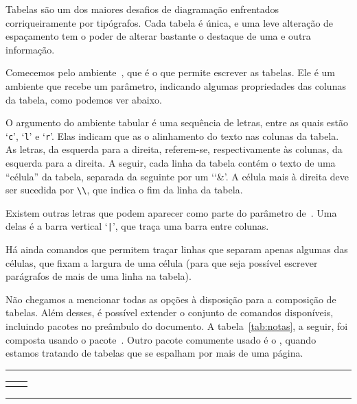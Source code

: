Tabelas são um dos maiores desafios de diagramação enfrentados
corriqueiramente por tipógrafos. Cada tabela é única, e uma leve
alteração de espaçamento tem o poder de alterar bastante o destaque de
uma e outra informação.

Comecemos pelo ambiente~, que é o que permite
escrever as tabelas. Ele é um ambiente que recebe um parâmetro,
indicando algumas propriedades das colunas da tabela, como podemos ver abaixo.

O argumento do ambiente tabular é uma sequência de letras, entre as
quais estão `{\tt c}', `{\tt l}' e `{\tt r}'. Elas indicam que as
o alinhamento do texto nas colunas da tabela. As letras, da esquerda
para a direita, referem-se, respectivamente às colunas, da esquerda
para a direita. A seguir, cada linha da tabela contém o texto de uma
``célula'' da tabela, separada da seguinte por um `\char`\&'. A célula
mais à direita deve ser sucedida por \verb'\\', que indica o fim da
linha da tabela.

Existem outras letras que podem aparecer como parte do parâmetro
de~. Uma delas é a barra vertical `{\tt |}', que
traça uma barra entre colunas. 

Há ainda comandos que permitem traçar linhas que separam apenas algumas das
células, que fixam a largura de uma célula (para que seja possível
escrever parágrafos de mais de uma linha na tabela). 

Não chegamos a mencionar todas as opções à disposição para a
composição de tabelas. Além desses, é possível extender o conjunto de
comandos disponíveis, incluindo pacotes no preâmbulo do documento. A
tabela~\ref{tab:notas}, a seguir, foi composta usando o
pacote~. Outro pacote comumente usado é o
, quando estamos tratando de tabelas que se espalham
por mais de uma página.

\medskip
\begin{center}\hrule\smallskip
\begin{tabular}{c|c}
\begin{minipage}{.405\textwidth}\footnotesize

\end{minipage} &
\begin{minipage}{.535\textwidth}

\end{minipage}
\end{tabular}
\smallskip\hrule
\end{center}
\medskip



